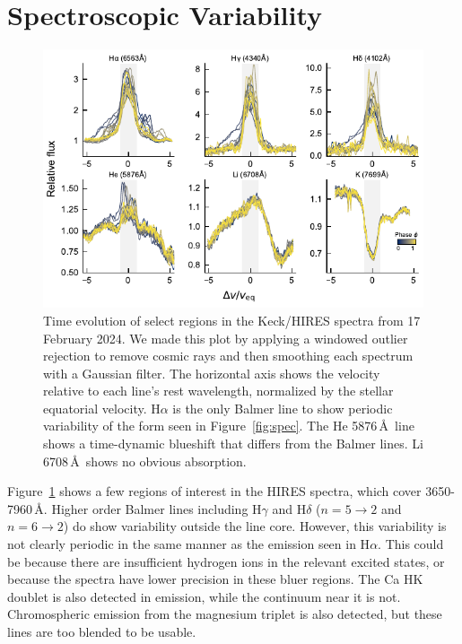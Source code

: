 \documentclass[11pt,twocolumn,tighten,linenumbers]{aastex7}
\begin{document}
\section{Spectroscopic Variability}
\label{subsec:specvar}

\begin{figure}[!t]
  \centering
  \includegraphics[width=\textwidth]{figures/sf5.pdf}
  \caption{Time evolution of select regions in the Keck/HIRES spectra
  from 17 February 2024.  We made this plot by applying a windowed
  outlier rejection to remove cosmic rays and then smoothing each
  spectrum with a Gaussian filter.  The horizontal axis shows the
  velocity relative to each line's rest wavelength, normalized by the
  stellar equatorial velocity.  H$\alpha$ is the only Balmer line to
  show periodic variability of the form seen in Figure~\ref{fig:spec}.
  The He 5876\,\AA\ line shows a time-dynamic blueshift that differs
  from the Balmer lines.  Li 6708\,\AA\ shows no obvious absorption. }
  \label{fig:hirescuts}
\end{figure}

Figure~\ref{fig:hirescuts} shows a few regions of
interest in the HIRES spectra, which cover 3650-7960\,\AA.  Higher
order Balmer lines including H$\gamma$ and H$\delta$
($n=5\rightarrow2$ and $n=6\rightarrow2$) do show variability outside
the line core.  However, this variability is not clearly periodic in
the same manner as the emission seen in H$\alpha$.  This could be
because there are insufficient hydrogen ions in the relevant excited
states, or because the spectra have lower precision in these bluer
regions.  The Ca HK doublet is also detected in emission, while the
continuum near it is not.  Chromospheric emission from the magnesium
triplet is also detected, but these lines are too blended to be
usable.
\end{document}

